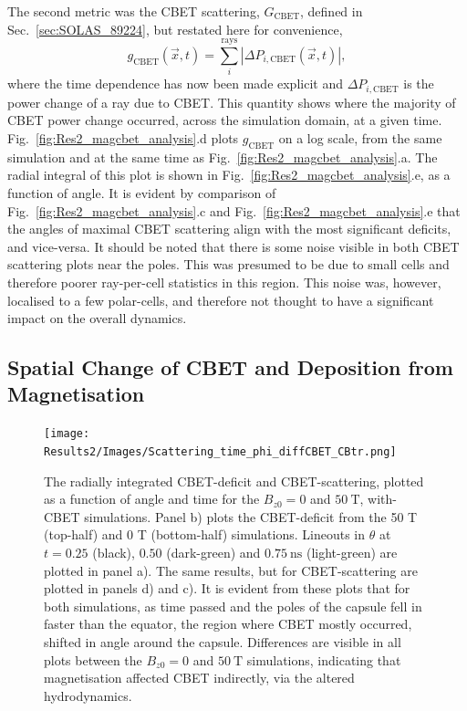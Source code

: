 The second metric was the \ac{CBET} scattering, $G_{\text{CBET}}$, defined in Sec.~\ref{sec:SOLAS_89224}, but restated here for convenience,
\begin{equation}
    \label{sec:res1_cbet_scattering}
    g_{\text{CBET}}(\vec{x},t) = \sum_{i}^{\text{rays}} \left| \Delta P_{i,\text{CBET}}(\vec{x},t) \right|,
\end{equation}
where the time dependence has now been made explicit and $\Delta P_{i,\text{CBET}}$ is the power change of a ray due to \ac{CBET}.
This quantity shows where the majority of \ac{CBET} power change occurred, across the simulation domain, at a given time.
Fig.~\ref{fig:Res2_magcbet_analysis}.d plots $g_{\text{CBET}}$ on a log scale, from the same simulation and at the same time as Fig.~\ref{fig:Res2_magcbet_analysis}.a.
The radial integral of this plot is shown in Fig.~\ref{fig:Res2_magcbet_analysis}.e, as a function of angle.
It is evident by comparison of Fig.~\ref{fig:Res2_magcbet_analysis}.c and Fig.~\ref{fig:Res2_magcbet_analysis}.e that the angles of maximal \ac{CBET} scattering align with the most significant deficits, and vice-versa.
It should be noted that there is some noise visible in both \ac{CBET} scattering plots near the poles.
This was presumed to be due to small cells and therefore poorer ray-per-cell statistics in this region.
This noise was, however, localised to a few polar-cells, and therefore not thought to have a significant impact on the overall dynamics.

\subsection{Spatial Change of CBET and Deposition from Magnetisation}%
\label{sec:Res2_mag_on_cbet_change}

\begin{figure}[t!]
    \texttt{[image: Results2/Images/Scattering\_time\_phi\_diffCBET\_CBtr.png]}
    \centering
    \caption{The radially integrated \ac{CBET}-deficit and \ac{CBET}-scattering, plotted as a function of angle and time for the $B_{z0}=0$ and $50\ \text{T}$, with-\ac{CBET} simulations.
    Panel b) plots the \ac{CBET}-deficit from the 50 T (top-half) and 0 T (bottom-half) simulations.
    Lineouts in $\theta$ at $t=0.25$ (black), $0.50$ (dark-green) and $0.75\ \text{ns}$ (light-green) are plotted in panel a).
    The same results, but for \ac{CBET}-scattering are plotted in panels d) and c).
    It is evident from these plots that for both simulations, as time passed and the poles of the capsule fell in faster than the equator, the region where \ac{CBET} mostly occurred, shifted in angle around the capsule.
    Differences are visible in all plots between the $B_{z0}=0$ and $50\ \text{T}$ simulations, indicating that magnetisation affected \ac{CBET} indirectly, via the altered hydrodynamics.}%
    \label{fig:Res2_scattering}
\end{figure}

